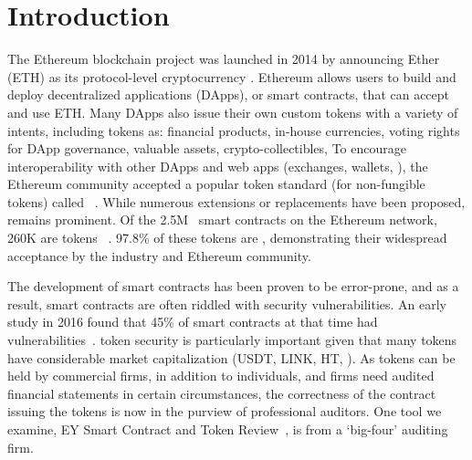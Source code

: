 
\section{Introduction}
\label{sect:introduction}

The Ethereum blockchain project was launched in 2014 by announcing Ether (ETH) as its protocol-level cryptocurrency \cite{EthGit,EIP150}. Ethereum allows users to build and deploy decentralized applications (DApps), or smart contracts, that can accept and use ETH. Many DApps also issue their own custom tokens with a variety of intents, including tokens as: financial products, in-house currencies, voting rights for DApp governance, valuable assets, crypto-collectibles, \etc To encourage interoperability with other DApps and web apps (exchanges, wallets, \etc), the Ethereum community accepted a popular token standard (for non-fungible tokens) called \erc~\cite{ERC20Std}. While numerous \erc extensions or replacements have been proposed, \erc remains prominent. Of the 2.5M~\cite{Alethio} smart contracts on the Ethereum network, 260K are tokens ~\cite{TokenTracker}. 97.8\% of these tokens are \erc\cite{EtherScan}, demonstrating their widespread acceptance by the industry and Ethereum community.

The development of smart contracts has been proven to be error-prone, and as a result, smart contracts are often riddled with security vulnerabilities. An early study in 2016 found that 45\% of smart contracts at that time had vulnerabilities~\cite{MakSm}. \erc token security is particularly important given that many tokens have considerable market capitalization (\eg USDT, LINK, HT, \etc). As tokens can be held by commercial firms, in addition to individuals, and firms need audited financial statements in certain circumstances, the correctness of the contract issuing the tokens is now in the purview of professional auditors. One tool we examine, EY Smart Contract and Token Review~\cite{EYTool}, is from a `big-four' auditing firm. 


